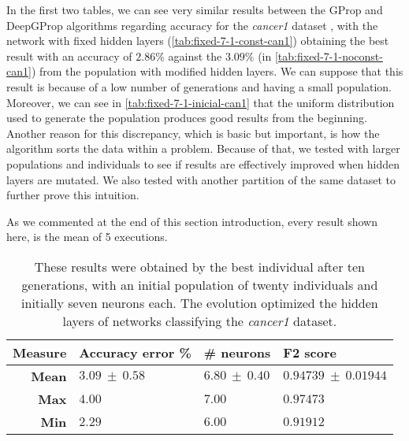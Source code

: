 \documentclass[runningheads]{llncs}
\begin{document}
In the first two tables, we can see very similar results between the GProp and
DeepGProp algorithms regarding accuracy for
the \emph{cancer1} dataset \cite{uci}, with the network with fixed hidden layers
(\autoref{tab:fixed-7-1-const-can1}) obtaining the best result with an accuracy
of $2.86\%$ against the $3.09\%$ (in \autoref{tab:fixed-7-1-noconst-can1}) from
the population with modified hidden layers. We can suppose that this result is
because of a low number of generations and having a small population. Moreover,
we can see in \autoref{tab:fixed-7-1-inicial-can1} that the uniform
distribution used to generate the population produces good results from the
beginning. Another reason for this discrepancy, which is basic but important, is
how the algorithm sorts the data within a problem. Because of that, we tested
with larger populations and individuals to see if results are effectively
improved when hidden layers are mutated. We also tested with another partition
of the same dataset to further prove this intuition. %

As we commented at the end of this section introduction, every result shown
here, is the mean of 5 executions. %

 \begin{table}
     \centering
     \caption{
These results were obtained by the best individual after ten generations, 
with an initial population of twenty individuals and initially seven neurons each. 
The evolution optimized the hidden layers of networks classifying the \emph{cancer1} dataset.}
     \label{tab:fixed-7-1-noconst-can1}
     \begin{tabular}{rlll}
         \textbf{Measure}   & \textbf{Accuracy error \%} & \textbf{\# neurons} & \textbf{F2 score} \\
         \hline
         \textbf{Mean}      & $3.09\ \pm\ 0.58$      & $6.80\ \pm\ 0.40$       & $0.94739\ \pm\ 0.01944$ \\
         \textbf{Max}       & $4.00$                 & $7.00$                  & $0.97473$               \\
         \textbf{Min}       & $2.29$                 & $6.00$                  & $0.91912$               \\
     \end{tabular}
 \end{table}
\end{document}
